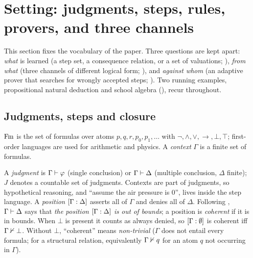 \providecommand{\ACCEPT}{\textsf{ACCEPT}}
\providecommand{\REJECT}{\textsf{REJECT}}
\providecommand{\ESCALATE}{\textsf{ESCALATE}}
\providecommand{\Steps}{\mathrm{Steps}}
\providecommand{\vars}{\mathrm{vars}}
\providecommand{\Ttrust}{T_{\mathrm{trust}}}
\providecommand{\Fres}[1]{F^{(#1)}_{\mathrm{res}}}

\section{Setting: judgments, steps, rules, provers, and three channels}\label{sec:setting}

This section fixes the vocabulary of the paper. Three questions are kept apart:
\emph{what} is learned (a step set, a consequence relation, or a
set of valuations; ), \emph{from what} (three channels of
different logical form; ), and \emph{against whom} (an
adaptive prover that searches for wrongly accepted steps;
). Two running examples, propositional natural
deduction and school algebra (), recur throughout.

\subsection{Judgments, steps and closure}\label{sec:setting:steps}

$\mathrm{Fm}$ is the set of formulas over atoms $p,q,r,p_0,p_1,\dots$ with
$\neg,\wedge,\vee,\to,\bot,\top$; first-order languages are used for arithmetic
and physics. A \emph{context} $\Gamma$ is a finite set of formulas.

\begin{definition}\label{def:setting:judgment}
A \emph{judgment} is $\Gamma\vdash\varphi$ (single conclusion) or $\Gamma\vdash\Delta$
(multiple conclusion, $\Delta$ finite); $J$ denotes a countable set of judgments.
Contexts are part of judgments, so hypothetical reasoning, and ``assume the air
pressure is $0$'', lives inside the step language. A \emph{position}
$[\Gamma : \Delta]$ asserts all of $\Gamma$ and denies all of $\Delta$.
Following \citet{restall2005multiple}, $\Gamma\vdash\Delta$ says that \emph{the
position $[\Gamma : \Delta]$ is out of bounds}; a position is \emph{coherent}
if it is in bounds. When $\bot$ is present it counts as always denied, so
$[\Gamma : \emptyset]$ is coherent iff $\Gamma\nvdash\bot$. Without $\bot$,
``coherent'' means \emph{non-trivial} ($\Gamma$ does not entail every formula;
for a structural relation, equivalently $\Gamma\nvdash q$ for an atom $q$ not
occurring in $\Gamma$).
\end{definition}

